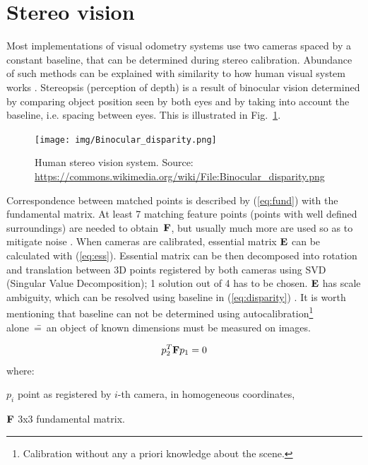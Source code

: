 
\section{Stereo vision}
\label{sec:stereo}

Most implementations of visual odometry systems use two cameras spaced by a constant baseline, that can be determined during stereo calibration. Abundance of such methods can be explained with similarity to how human visual system works \cite{cyganek}. Stereopsis (perception of depth) is a result of binocular vision determined by comparing object position seen by both eyes and by taking into account the baseline, i.e. spacing between eyes. This is illustrated in Fig.~\ref{fig:stereo}.

\begin{figure}[ht]
	\centering\texttt{[image: img/Binocular\_disparity.png]}
	\caption{Human stereo vision system. Source: \url{https://commons.wikimedia.org/wiki/File:Binocular_disparity.png}}
	\label{fig:stereo}
\end{figure}

Correspondence between matched points is described by (\ref{eq:fund}) with the fundamental matrix. At least 7 matching feature points (points with well defined surroundings) are needed to obtain~$\textbf{F}$, but usually much more are used so as to mitigate noise \cite{zhang1998determining}. When cameras are calibrated, essential matrix $\textbf{E}$ can be calculated with (\ref{eq:ess}). Essential matrix can be then decomposed into rotation and translation between 3D points registered by both cameras using SVD (Singular Value Decomposition); 1 solution out of 4 has to be chosen. $\textbf{E}$ has scale ambiguity, which can be resolved using baseline in (\ref{eq:disparity}) \cite{improving}. It is worth mentioning that baseline can not be determined using autocalibration\footnote{Calibration without any a priori knowledge about the scene.} alone~\==~an object of known dimensions must be measured on images.

\begin{equation}
p_{2}^{T}\textbf{F}p_{1}=0
\label{eq:fund}
\end{equation}
where:
\begin{eqwhere}[2cm]
	\item[$p_{i}$] point as registered by $i$-th camera, in homogeneous coordinates,
	\item[$\textbf{F}$] 3x3 fundamental matrix.
\end{eqwhere}

